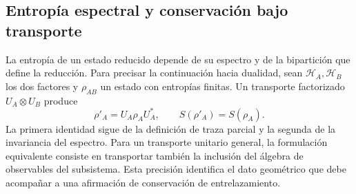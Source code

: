 \subsection{Entropía espectral y conservación bajo transporte}
\label{v:ant:sec:biparticion-transporte}

La entropía de un estado reducido depende de su espectro y de la
bipartición que define la reducción. Para precisar la continuación
hacia dualidad, sean \(\mathcal H_A,\mathcal H_B\) los dos factores
y \(\rho_{AB}\) un estado con entropías finitas. Un transporte
factorizado \(U_A\otimes U_B\) produce
\[
 \rho'_A=U_A\rho_AU_A^*,\qquad S(\rho'_A)=S(\rho_A).
\]
La primera identidad sigue de la definición de traza parcial y la
segunda de la invariancia del espectro. Para un transporte unitario
general, la formulación equivalente consiste en transportar también
la inclusión del álgebra de observables del subsistema. Esta precisión
identifica el dato geométrico que debe acompañar a una afirmación
de conservación de entrelazamiento.
